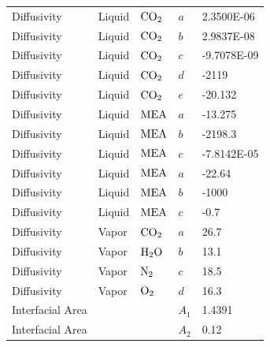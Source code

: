 \documentclass[a4paper,fleqn]{cas-sc}
\begin{document}
\begin{longtable}{lllll}
        Diffusivity               & Liquid         & $\ce{CO2}$          & $a$               & 2.3500E-06     \\
        Diffusivity               & Liquid         & $\ce{CO2}$          & $b$               & 2.9837E-08     \\
        Diffusivity               & Liquid         & $\ce{CO2}$          & $c$               & -9.7078E-09    \\
        Diffusivity               & Liquid         & $\ce{CO2}$          & $d$               & -2119          \\
        Diffusivity               & Liquid         & $\ce{CO2}$          & $e$               & -20.132        \\
        Diffusivity               & Liquid         & $\ce{MEA}$          & $a$               & -13.275        \\
        Diffusivity               & Liquid         & $\ce{MEA}$          & $b$               & -2198.3        \\
        Diffusivity               & Liquid         & $\ce{MEA}$          & $c$               & -7.8142E-05    \\
        Diffusivity               & Liquid         & $\ce{MEA}$          & $a$               & -22.64         \\
        Diffusivity               & Liquid         & $\ce{MEA}$          & $b$               & -1000          \\
        Diffusivity               & Liquid         & $\ce{MEA}$          & $c$               & -0.7           \\
        Diffusivity               & Vapor          & $\ce{CO2}$          & $a$               & 26.7           \\
        Diffusivity               & Vapor          & $\ce{H2O}$          & $b$               & 13.1           \\
        Diffusivity               & Vapor          & $\ce{N2}$           & $c$               & 18.5           \\
        Diffusivity               & Vapor          & $\ce{O2}$           & $d$               & 16.3           \\
        Interfacial Area          &                &                     & $A_1$             & 1.4391         \\
        Interfacial Area          &                &                     & $A_2$             & 0.12           \\

\end{longtable}
\end{document}
